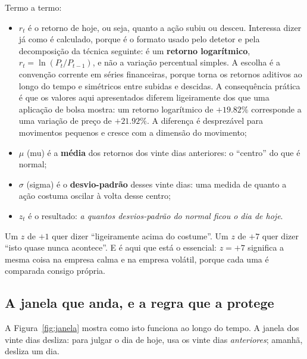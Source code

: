 Termo a termo:

\begin{itemize}
  \item $r_t$ é o retorno de hoje, ou seja, quanto a ação subiu ou desceu. Interessa dizer já como
        é calculado, porque é o formato usado pelo detetor e pela decomposição da técnica seguinte: é um
        \textbf{retorno logarítmico}, $r_t = \ln(P_t / P_{t-1})$, e não a variação percentual
        simples. A escolha é a convenção corrente em séries financeiras, porque torna os retornos
        aditivos ao longo do tempo e simétricos entre subidas e descidas. A consequência prática é
        que os valores aqui apresentados diferem ligeiramente dos que uma aplicação de bolsa mostra:
        um retorno logarítmico de $+19.82\%$ corresponde a uma variação de preço de $+21.92\%$. A
        diferença é desprezável para movimentos pequenos e cresce com a dimensão do movimento;
  \item $\mu$ (mu) é a \textbf{média} dos retornos dos vinte dias anteriores: o ``centro'' do que é
        normal;
  \item $\sigma$ (sigma) é o \textbf{desvio-padrão} desses vinte dias: uma medida de quanto a ação
        costuma oscilar à volta desse centro;
  \item $z_t$ é o resultado: \emph{a quantos desvios-padrão do normal ficou o dia de hoje}.
\end{itemize}

Um $z$ de $+1$ quer dizer ``ligeiramente acima do costume''. Um $z$ de $+7$ quer dizer ``isto quase
nunca acontece''. E é aqui que está o essencial: $z = +7$ significa a mesma coisa na empresa calma e
na empresa volátil, porque cada uma é comparada consigo própria.

\subsection{A janela que anda, e a regra que a protege}

A Figura~\ref{fig:janela} mostra como isto funciona ao longo do tempo. A janela dos vinte dias
desliza: para julgar o dia de hoje, usa os vinte dias \emph{anteriores}; amanhã, desliza um dia.

